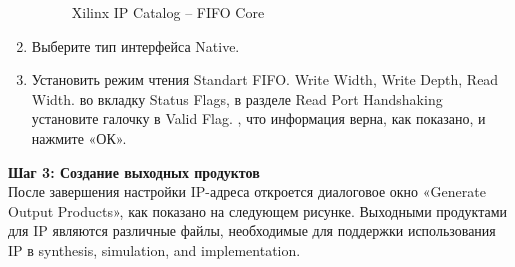 \begin{enumerate}
\begin{figure}[h]
\caption{Xilinx IP Catalog – FIFO Core}
\label{fifo_ip_2_label}
\end{figure}
\item Выберите тип интерфейса Native.
\item Установить режим чтения Standart FIFO.
 Write Width, Write Depth, Read Width.
 во вкладку Status Flags, в разделе Read Port Handshaking установите галочку в Valid Flag.
, что информация верна, как показано, и нажмите «ОК».
\end{enumerate}

\textbf{Шаг 3: Создание выходных продуктов} \\ 

После завершения настройки IP-адреса откроется диалоговое окно «Generate Output Products», как показано на следующем рисунке. Выходными продуктами для IP являются различные файлы, необходимые для поддержки использования IP в synthesis, simulation, and implementation. 
